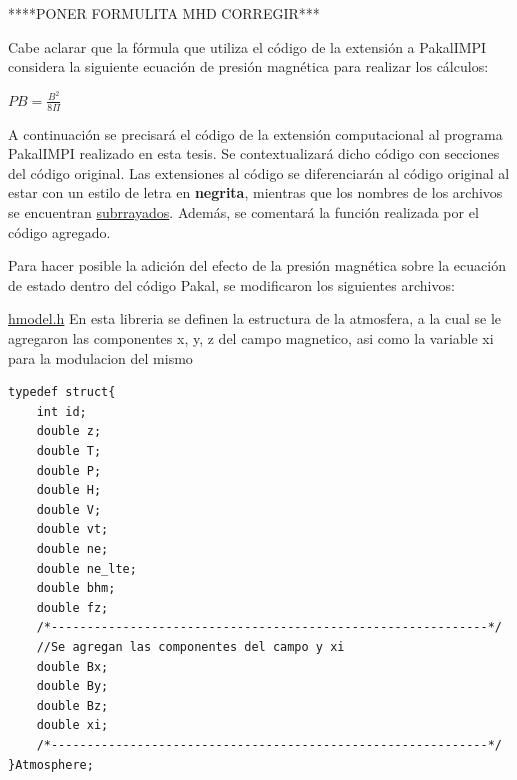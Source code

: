 \documentclass[9pt]{book}
\begin{document}
****PONER FORMULITA MHD CORREGIR***

Cabe aclarar que la f\'ormula que utiliza el c\'odigo de la extensi\'on a PakalIMPI considera la siguiente ecuaci\'on de presi\'on magn\'etica para realizar los c\'alculos:

$PB = \frac{B^2}{8\Pi}$

A continuaci\'on se precisar\'a el c\'odigo de la extensi\'on computacional al programa PakalIMPI realizado en esta tesis. Se contextualizar\'a dicho c\'odigo con secciones del c\'odigo original. Las extensiones al c\'odigo se diferenciar\'an al c\'odigo original al estar con un estilo de letra en \textbf{negrita}, mientras que los nombres de los archivos se encuentran \underline{subrrayados}. Adem\'as, se comentar\'a la funci\'on realizada por el c\'odigo agregado. 

Para hacer posible la adici\'on del efecto de la presi\'on magn\'etica sobre la ecuaci\'on de estado dentro del c\'odigo Pakal, se modificaron los siguientes archivos:\newline \newline \newline \newline

\underline{hmodel.h}
En esta libreria se definen la estructura de la atmosfera, a la cual se le agregaron las componentes x, y, z del campo magnetico, asi como la variable xi para la modulacion del mismo
\begin{lstlisting}[style=CStyle]
typedef struct{
	int id;
	double z;
	double T;
	double P;
	double H;
	double V;
	double vt;
	double ne;
	double ne_lte;
	double bhm;
	double fz;
	/*-------------------------------------------------------------*/
	//Se agregan las componentes del campo y xi
	double Bx;
	double By;
	double Bz;
	double xi;
	/*-------------------------------------------------------------*/	
}Atmosphere;

\end{lstlisting}
\end{document}
